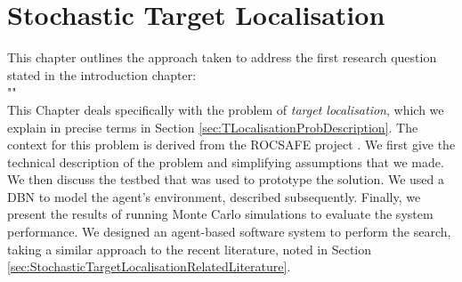 
\chapter{Stochastic Target Localisation}\label{chap:targetLocalisation}
This chapter outlines the approach taken to address the first research question stated in the introduction chapter:
\\
"\textit{}"
\\
This Chapter deals specifically with the problem of \textit{target localisation}, which we explain in precise terms in Section \ref{sec:TLocalisationProbDescription}. The context for this problem is derived from the ROCSAFE project \cite{Bagherzadeh2017ROCSAFE:Incidents}. We first give the technical description of the problem and simplifying assumptions that we made. We then discuss the testbed that was used to prototype the solution. We used a DBN to model the agent's environment, described subsequently. Finally, we present the results of running Monte Carlo simulations to evaluate the system performance. We designed an agent-based software system to perform the search, taking a similar approach to the recent literature, noted in Section \ref{sec:StochasticTargetLocalisationRelatedLiterature}.











\label{sec:SimulationResults}

